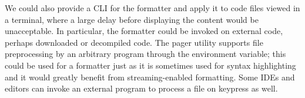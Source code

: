 We could also provide a CLI for the formatter and apply it to code files viewed in a terminal,
where a large delay before displaying the content would be unacceptable.
In particular, the formatter could be invoked on external code, perhaps downloaded or decompiled code.
The  pager utility supports file preprocessing by an arbitrary program
through the  environment variable; \autocite{lessMan}
this could be used for a formatter just as it is sometimes used for syntax highlighting
and it would greatly benefit from streaming-enabled formatting.
Some IDEs and editors can invoke an external program to process a file on keypress as well.
